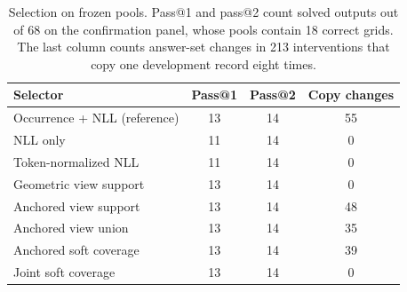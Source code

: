 \begin{table}[t]\centering\footnotesize
\caption{Selection on frozen pools. Pass@1 and pass@2 count solved outputs out of 68 on the confirmation panel, whose pools contain 18 correct grids. The last column counts answer-set changes in 213 interventions that copy one development record eight times.}\label{tab:selectors}
\setlength{\tabcolsep}{4pt}\begin{tabular}{lccc}\toprule
Selector & Pass@1 & Pass@2 & Copy changes \\\midrule
Occurrence + NLL (reference) & 13 & 14 & 55 \\
NLL only & 11 & 14 & 0 \\
Token-normalized NLL & 11 & 14 & 0 \\
Geometric view support & 13 & 14 & 0 \\
Anchored view support & 13 & 14 & 48 \\
Anchored view union & 13 & 14 & 35 \\
Anchored soft coverage & 13 & 14 & 39 \\
Joint soft coverage & 13 & 14 & 0 \\
\bottomrule\end{tabular}\end{table}
